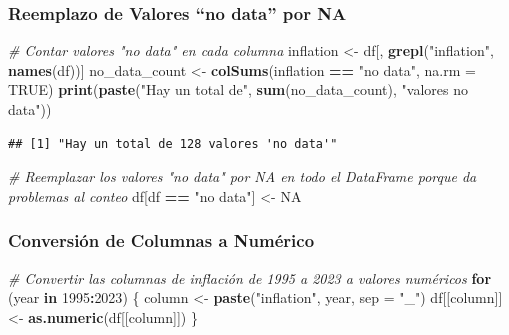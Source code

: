 \documentclass[
]{article}
\newenvironment{Shaded}{\begin{snugshade}}{\end{snugshade}}
\newcommand{\AttributeTok}[1]{\textcolor[rgb]{0.13,0.29,0.53}{#1}}
\newcommand{\CommentTok}[1]{\textcolor[rgb]{0.56,0.35,0.01}{\textit{#1}}}
\newcommand{\ConstantTok}[1]{\textcolor[rgb]{0.56,0.35,0.01}{#1}}
\newcommand{\ControlFlowTok}[1]{\textcolor[rgb]{0.13,0.29,0.53}{\textbf{#1}}}
\newcommand{\DecValTok}[1]{\textcolor[rgb]{0.00,0.00,0.81}{#1}}
\newcommand{\FunctionTok}[1]{\textcolor[rgb]{0.13,0.29,0.53}{\textbf{#1}}}
\newcommand{\NormalTok}[1]{#1}
\newcommand{\OtherTok}[1]{\textcolor[rgb]{0.56,0.35,0.01}{#1}}
\newcommand{\SpecialCharTok}[1]{\textcolor[rgb]{0.81,0.36,0.00}{\textbf{#1}}}
\newcommand{\StringTok}[1]{\textcolor[rgb]{0.31,0.60,0.02}{#1}}
\begin{document}
\subsubsection{Reemplazo de Valores ``no data'' por
NA}\label{reemplazo-de-valores-no-data-por-na}

\begin{Shaded}
\begin{Highlighting}[]
\CommentTok{\# Contar valores "no data" en cada columna}
\NormalTok{inflation }\OtherTok{\textless{}{-}}\NormalTok{ df[, }\FunctionTok{grepl}\NormalTok{(}\StringTok{"inflation"}\NormalTok{, }\FunctionTok{names}\NormalTok{(df))]}
\NormalTok{no\_data\_count }\OtherTok{\textless{}{-}} \FunctionTok{colSums}\NormalTok{(inflation }\SpecialCharTok{==} \StringTok{"no data"}\NormalTok{, }\AttributeTok{na.rm =} \ConstantTok{TRUE}\NormalTok{)}
\FunctionTok{print}\NormalTok{(}\FunctionTok{paste}\NormalTok{(}\StringTok{"Hay un total de"}\NormalTok{, }\FunctionTok{sum}\NormalTok{(no\_data\_count), }\StringTok{"valores \textquotesingle{}no data\textquotesingle{}"}\NormalTok{))}
\end{Highlighting}
\end{Shaded}

\begin{verbatim}
## [1] "Hay un total de 128 valores 'no data'"
\end{verbatim}

\begin{Shaded}
\begin{Highlighting}[]
\CommentTok{\# Reemplazar los valores "no data" por NA en todo el DataFrame porque da problemas al conteo}
\NormalTok{df[df }\SpecialCharTok{==} \StringTok{"no data"}\NormalTok{] }\OtherTok{\textless{}{-}} \ConstantTok{NA}
\end{Highlighting}
\end{Shaded}

\subsubsection{Conversión de Columnas a
Numérico}\label{conversion-de-columnas-a-numerico}

\begin{Shaded}
\begin{Highlighting}[]
\CommentTok{\# Convertir las columnas de inflación de 1995 a 2023 a valores numéricos}
\ControlFlowTok{for}\NormalTok{ (year }\ControlFlowTok{in} \DecValTok{1995}\SpecialCharTok{:}\DecValTok{2023}\NormalTok{) \{}
\NormalTok{  column }\OtherTok{\textless{}{-}} \FunctionTok{paste}\NormalTok{(}\StringTok{"inflation"}\NormalTok{, year, }\AttributeTok{sep =} \StringTok{"\_"}\NormalTok{)}
\NormalTok{  df[[column]] }\OtherTok{\textless{}{-}} \FunctionTok{as.numeric}\NormalTok{(df[[column]])}
\NormalTok{\}}
\end{Highlighting}
\end{Shaded}
\end{document}
